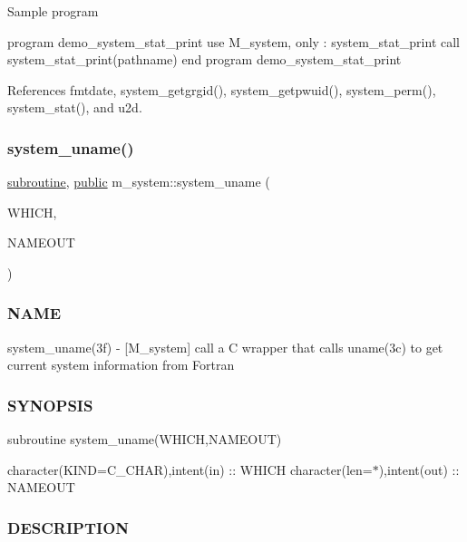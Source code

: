 Sample program

program demo\+\_\+system\+\_\+stat\+\_\+print use M\+\_\+system, only \+: system\+\_\+stat\+\_\+print call system\+\_\+stat\+\_\+print(pathname) end program demo\+\_\+system\+\_\+stat\+\_\+print 

References fmtdate, system\+\_\+getgrgid(), system\+\_\+getpwuid(), system\+\_\+perm(), system\+\_\+stat(), and u2d.

\mbox{\label{namespacem__system_a04e5d49509c44bcb2ccabfd80ec8cdfb}} 
\subsubsection{\texorpdfstring{system\+\_\+uname()}{system\_uname()}}
{\footnotesize\ttfamily \hyperlink{M__stopwatch_83_8txt_acfbcff50169d691ff02d4a123ed70482}{subroutine}, \hyperlink{M__stopwatch_83_8txt_a2f74811300c361e53b430611a7d1769f}{public} m\+\_\+system\+::system\+\_\+uname (\begin{DoxyParamCaption}\item[{\hyperlink{option__stopwatch_83_8txt_abd4b21fbbd175834027b5224bfe97e66}{character}(kind=c\+\_\+char), intent(\hyperlink{M__journal_83_8txt_afce72651d1eed785a2132bee863b2f38}{in})}]{W\+H\+I\+CH,  }\item[{\hyperlink{option__stopwatch_83_8txt_abd4b21fbbd175834027b5224bfe97e66}{character}(len=$\ast$), intent(out)}]{N\+A\+M\+E\+O\+UT }\end{DoxyParamCaption})}



\subsubsection*{N\+A\+ME}

system\+\_\+uname(3f) -\/ \mbox{[}M\+\_\+system\mbox{]} call a C wrapper that calls uname(3c) to get current system information from Fortran \subsubsection*{S\+Y\+N\+O\+P\+S\+IS}

subroutine system\+\_\+uname(\+W\+H\+I\+C\+H,\+N\+A\+M\+E\+O\+U\+T)

character(K\+I\+ND=C\+\_\+\+C\+H\+AR),intent(in) \+:\+: W\+H\+I\+CH character(len=$\ast$),intent(out) \+:\+: N\+A\+M\+E\+O\+UT \subsubsection*{D\+E\+S\+C\+R\+I\+P\+T\+I\+ON}


